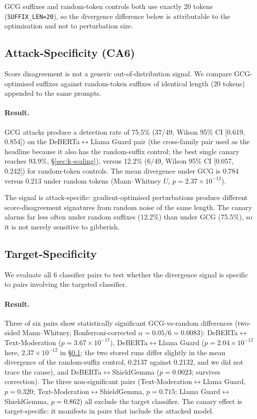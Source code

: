 \documentclass{article}
\begin{document}
GCG suffixes and random-token controls both use exactly 20 tokens (\texttt{SUFFIX\_LEN=20}), so the divergence difference below is attributable to the optimisation and not to perturbation size.

\subsection{Attack-Specificity (CA6)}
\label{sec:ca6}

Score disagreement is not a generic out-of-distribution signal. We compare GCG-optimised suffixes against random-token suffixes of identical length (20 tokens) appended to the same prompts.

\paragraph{Result.} GCG attacks produce a detection rate of 75.5\% (37/49, Wilson 95\% CI [0.619, 0.854]) on the DeBERTa$\leftrightarrow$Llama Guard pair (the cross-family pair used as the headline because it also has the random-suffix control; the best single canary reaches 93.9\%, \S\ref{sec:k-scaling}), versus 12.2\% (6/49, Wilson 95\% CI [0.057, 0.242]) for random-token controls. The mean divergence under GCG is 0.784 versus 0.213 under random tokens (Mann--Whitney $U$, $p = 2.37 \times 10^{-12}$).

The signal is attack-specific: gradient-optimised perturbations produce different score-disagreement signatures from random noise of the same length. The canary alarms far less often under random suffixes (12.2\%) than under GCG (75.5\%), so it is not merely sensitive to gibberish.

\subsection{Target-Specificity}
\label{sec:target-specificity}

We evaluate all 6 classifier pairs to test whether the divergence signal is specific to pairs involving the targeted classifier.

\paragraph{Result.} Three of six pairs show statistically significant GCG-vs-random differences (two-sided Mann--Whitney, Bonferroni-corrected $\alpha = 0.05/6 = 0.0083$): DeBERTa$\leftrightarrow$Text-Moderation ($p = 3.67 \times 10^{-17}$), DeBERTa$\leftrightarrow$Llama Guard ($p = 2.04 \times 10^{-12}$ here, $2.37 \times 10^{-12}$ in \S\ref{sec:ca6}; the two stored runs differ slightly in the mean divergence of the random-suffix control, 0.2137 against 0.2132, and we did not trace the cause), and DeBERTa$\leftrightarrow$ShieldGemma ($p = 0.0023$; survives correction). The three non-significant pairs (Text-Moderation$\leftrightarrow$Llama Guard, $p = 0.320$; Text-Moderation$\leftrightarrow$ShieldGemma, $p = 0.715$; Llama Guard$\leftrightarrow$ShieldGemma, $p = 0.862$) all exclude the target classifier. The canary effect is target-specific: it manifests in pairs that include the attacked model.
\end{document}
